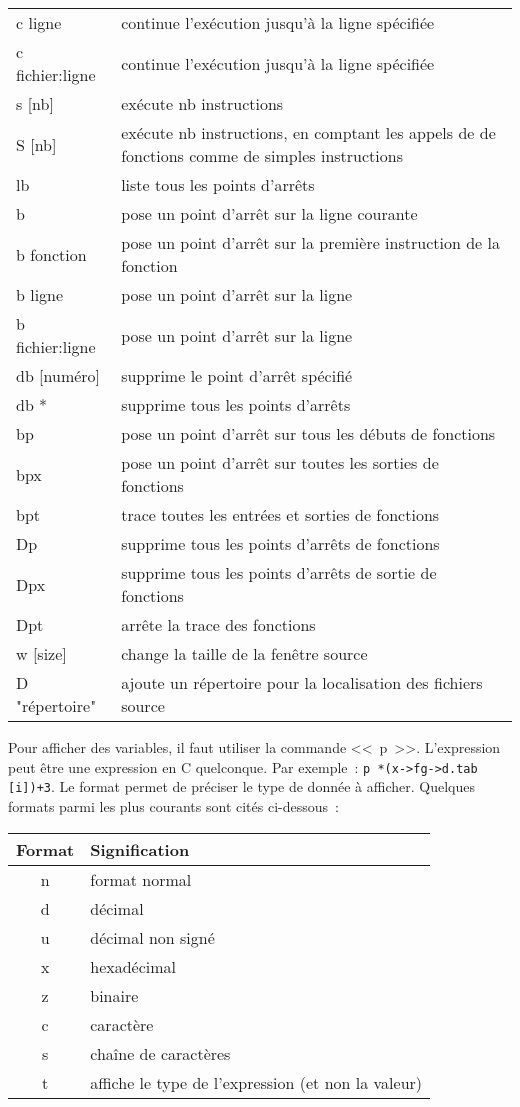 {\begin {tabular} {|l|p{90mm}|}
c ligne		& continue l'exécution jusqu'à la ligne spécifiée \\
c fichier:ligne	& continue l'exécution jusqu'à la ligne spécifiée \\
s [nb]		& exécute nb instructions \\
S [nb]		& exécute nb instructions, en comptant les appels de de fonctions comme de simples instructions \\
    \hline
lb		& liste tous les points d'arrêts \\
b		& pose un point d'arrêt sur la ligne courante \\
b fonction	& pose un point d'arrêt sur la première instruction de la fonction \\
b ligne		& pose un point d'arrêt sur la ligne \\
b fichier:ligne	& pose un point d'arrêt sur la ligne \\
db [numéro]	& supprime le point d'arrêt spécifié \\
db *		& supprime tous les points d'arrêts \\
bp		& pose un point d'arrêt sur tous les débuts de fonctions \\
bpx		& pose un point d'arrêt sur toutes les sorties de fonctions \\
bpt		& trace toutes les entrées et sorties de fonctions \\
Dp		& supprime tous les points d'arrêts de fonctions \\
Dpx		& supprime tous les points d'arrêts de sortie de fonctions \\
Dpt		& arrête la trace des fonctions \\
    \hline
w [size]	& change la taille de la fenêtre source \\
D "répertoire"	& ajoute un répertoire pour la localisation des fichiers source \\
\hline
\end {tabular}
}

Pour afficher des variables, il faut utiliser la commande <<~p~>>.
L'expression peut être une expression en C quelconque.
Par exemple~: \verb|p *(x->fg->d.tab [i])+3|. Le format permet
de préciser le type de donnée à afficher. Quelques formats parmi
les plus courants sont cités ci-dessous~:

\begin {tabular} {|c|l|} \hline
    \bf Format & \bf Signification \\ \hline
    n & format normal \\
    d & décimal \\
    u & décimal non signé \\
    x & hexadécimal \\
    z & binaire \\
    c & caractère \\
    s & chaîne de caractères \\
    t & affiche le type de l'expression (et non la valeur) \\
    \hline
\end {tabular}

